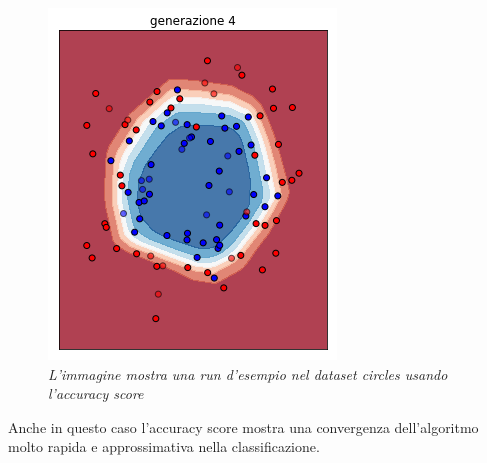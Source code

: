 \documentclass[12pt,a4paper]{report}
\begin{document}
\begin{figure}[H]
 \includegraphics[scale = 0.5]{images/circles-rnd-acc/4}
 \caption{\textit{L'immagine mostra una run d'esempio nel dataset circles usando l'accuracy score}}
 \label{circles1}
\end{figure}

Anche in questo caso l'accuracy score mostra una convergenza dell'algoritmo molto rapida e approssimativa nella classificazione.
\end{document}
